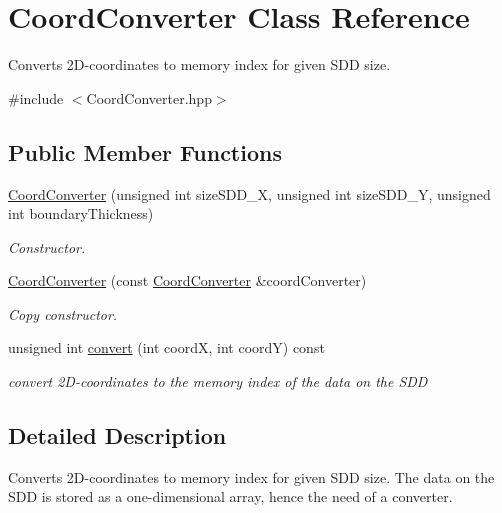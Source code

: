 \hypertarget{classCoordConverter}{
\section{CoordConverter Class Reference}
\label{classCoordConverter}
}


Converts 2D-\/coordinates to memory index for given SDD size.  


{\ttfamily \#include $<$CoordConverter.hpp$>$}\subsection*{Public Member Functions}
\begin{DoxyCompactItemize}
\item 
\hyperlink{classCoordConverter_a0e773a3ee5461119d7ff285fde45427d}{CoordConverter} (unsigned int sizeSDD\_\-X, unsigned int sizeSDD\_\-Y, unsigned int boundaryThickness)
\begin{DoxyCompactList}\small\item\em Constructor. \item\end{DoxyCompactList}\item 
\hyperlink{classCoordConverter_af11209a489a46dd335db0635d811999d}{CoordConverter} (const \hyperlink{classCoordConverter}{CoordConverter} \&coordConverter)
\begin{DoxyCompactList}\small\item\em Copy constructor. \item\end{DoxyCompactList}\item 
\hypertarget{classCoordConverter_a3c3acdaa77608aec958ce91431a36757}{
unsigned int \hyperlink{classCoordConverter_a3c3acdaa77608aec958ce91431a36757}{convert} (int coordX, int coordY) const }
\label{classCoordConverter_a3c3acdaa77608aec958ce91431a36757}

\begin{DoxyCompactList}\small\item\em convert 2D-\/coordinates to the memory index of the data on the SDD \item\end{DoxyCompactList}\end{DoxyCompactItemize}


\subsection{Detailed Description}
Converts 2D-\/coordinates to memory index for given SDD size. The data on the SDD is stored as a one-\/dimensional array, hence the need of a converter. 


